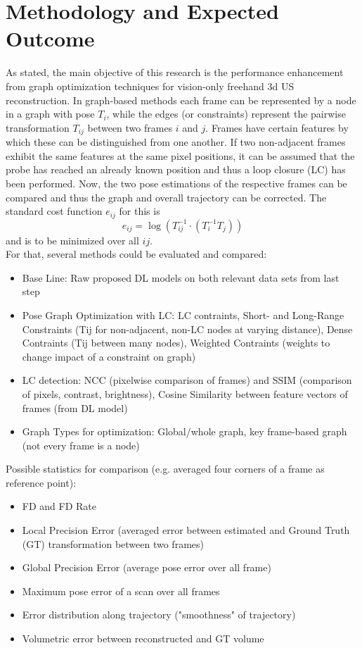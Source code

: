 \documentclass[10.5pt,a4paper]{article}
\begin{document}
\section{Methodology and Expected Outcome}
As stated, the main objective of this research is the performance enhancement from graph optimization techniques for vision-only freehand 3d US reconstruction. In graph-based methods each frame can be represented by a node in a graph with pose $T_i$, while the edges (or constraints) represent the pairwise transformation $T_{ij}$ between two frames $i$ and $j$. Frames have certain features by which these can be distinguished from one another. If two non-adjacent frames exhibit the same features at the same pixel positions, it can be assumed that the probe has reached an already known position and thus a loop closure (LC) has been performed. Now, the two pose estimations of the respective frames can be compared and thus the graph and overall trajectory can be corrected. The standard cost function $e_{ij}$ for this is\\
\begin{equation}
e_{ij} = \log \left( T_{ij}^{-1} \cdot (T_i^{-1} T_j) \right)
\end{equation}
and is to be minimized over all $ij$\cite{Youyang.2020}.\\
For that, several methods could be evaluated and compared:
\begin{itemize}
\item Base Line: Raw proposed DL models on both relevant data sets from last step
\item Pose Graph Optimization with LC: LC contraints, Short- and Long-Range Constraints (Tij for non-adjacent, non-LC nodes at varying distance), Dense Contraints (Tij between many nodes), Weighted Contraints (weights to change impact of a constraint on graph)
\item LC detection: NCC (pixelwise comparison of frames) and SSIM (comparison of pixels, contrast, brightness), Cosine Similarity between feature vectors of frames (from DL model)
\item Graph Types for optimization: Global/whole graph, key frame-based graph (not every frame is a node)
\end{itemize}

\noindent Possible statistics for comparison (e.g. averaged four corners of a frame as reference point):
\begin{itemize}
\item FD and FD Rate
\item Local Precision Error (averaged error between estimated and Ground Truth (GT) transformation between two frames)
\item Global Precision Error (average pose error over all frame)
\item Maximum pose error of a scan over all frames
\item Error distribution along trajectory ("smoothness" of trajectory)
\item Volumetric error between reconstructed and GT volume
\end{itemize}
\end{document}
